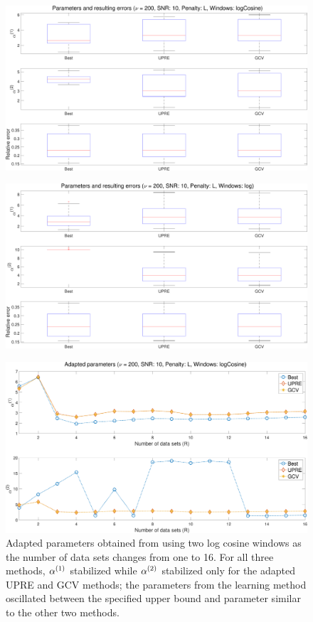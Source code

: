 \documentclass[12pt]{article}
\begin{document}
\begin{figure}[ht]
\centering
\includegraphics[width=1.0\textwidth]{Figures/Boxplot_v200_SNR10_logCos2_L.pdf}
\caption{}
\label{fig:Boxplot_v200_SNR10_logCos2_L}
\end{figure}

\begin{figure}[ht]
\centering
\includegraphics[width=1.0\textwidth]{Figures/Boxplot_v200_SNR10_log2_L.pdf}
\caption{}
\label{fig:Boxplot_v200_SNR10_log2_L}
\end{figure}

\begin{figure}[ht]
\centering
\includegraphics[width=1.0\textwidth]{Figures/Convergence_v200_SNR10_logCos2_L.pdf}
\caption{Adapted parameters obtained from using two log cosine windows as the number of data sets changes from one to 16. For all three methods, $\alpha^{(1)}$ stabilized while $\alpha^{(2)}$ stabilized only for the adapted UPRE and GCV methods; the parameters from the learning method oscillated between the specified upper bound and parameter similar to the other two methods.}
\label{fig:Convergence of Adapted Parameters}
\end{figure}
\end{document}
